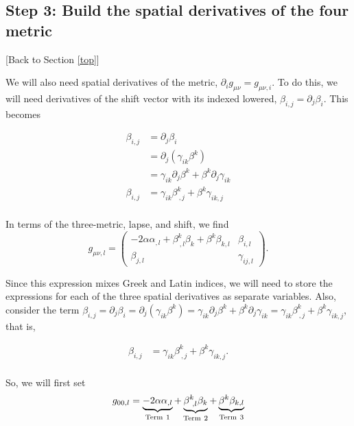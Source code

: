 \documentclass[landscape,letterpaper,10pt,english]{article}
\begin{document}
    \subsection{Step 3: Build the spatial derivatives of the four
metric}\label{step-3-build-the-spatial-derivatives-of-the-four-metric}

\[\label{step3}\] {[}Back to Section \ref{top}{]}

We will also need spatial derivatives of the metric,
\(\partial_i g_{\mu\nu} = g_{\mu\nu,i}\). To do this, we will need
derivatives of the shift vector with its indexed lowered,
\(\beta_{i,j} = \partial_j \beta_i\). This becomes

\begin{align}
\beta_{i,j} &= \partial_j \beta_i \\
            &= \partial_j (\gamma_{ik} \beta^k) \\
            &= \gamma_{ik} \partial_j\beta^k + \beta^k \partial_j \gamma_{ik} \\
\beta_{i,j} &= \gamma_{ik} \beta^k_{\ ,j} + \beta^k \gamma_{ik,j} \\
\end{align}

In terms of the three-metric, lapse, and shift, we find \[
g_{\mu\nu,l} = \begin{pmatrix} 
-2\alpha \alpha_{,l} + \beta^k_{\ ,l} \beta_k + \beta^k \beta_{k,l} & \beta_{i,l} \\
\beta_{j,l} & \gamma_{ij,l}
\end{pmatrix}.
\]

Since this expression mixes Greek and Latin indices, we will need to
store the expressions for each of the three spatial derivatives as
separate variables. Also, consider the term
\(\beta_{i,j} = \partial_j \beta_i = \partial_j (\gamma_{ik} \beta^k) = \gamma_{ik} \partial_j\beta^k + \beta^k \partial_j \gamma_{ik} = \gamma_{ik} \beta^k_{\ ,j} + \beta^k \gamma_{ik,j}\),
that is,

\begin{align}
\beta_{i,j} &= \gamma_{ik} \beta^k_{\ ,j} + \beta^k \gamma_{ik,j}. \\
\end{align}

So, we will first set
\[ g_{00,l} = \underbrace{-2\alpha \alpha_{,l}}_{\rm Term\ 1} + \underbrace{\beta^k_{\ ,l} \beta_k}_{\rm Term\ 2} + \underbrace{\beta^k \beta_{k,l}}_{\rm Term\ 3} \]
\end{document}
